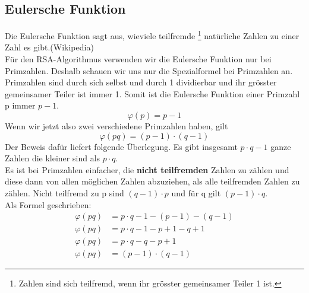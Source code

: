 \subsection{Eulersche Funktion}
Die Eulersche Funktion sagt aus, wieviele teilfremde \footnote{Zahlen sind sich teilfremd, wenn ihr grösster gemeinsamer Teiler 1 ist.} natürliche Zahlen zu einer Zahl es gibt.(Wikipedia)\\
Für den RSA-Algorithmus verwenden wir die Eulersche Funktion nur bei Primzahlen. Deshalb schauen wir uns nur die Spezialformel bei Primzahlen an.\\
Primzahlen sind durch sich selbst und durch 1 dividierbar und ihr grösster gemeinsamer Teiler ist immer 1. Somit ist die Eulersche Funktion einer Primzahl p immer $p - 1$.
%
\begin{equation*}
  \varphi(p) = p - 1
\end{equation*}
%
Wenn wir jetzt also zwei verschiedene Primzahlen haben, gilt
\begin{equation}
  \varphi(pq) = (p - 1) \cdot (q - 1)
  \label{eqn:eulersche_func}
\end{equation}
Der Beweis dafür liefert folgende Überlegung. Es gibt insgesamt $p \cdot q -1$ ganze Zahlen die kleiner sind als $p \cdot q$.\\
Es ist bei Primzahlen einfacher, die \textbf{nicht teilfremden} Zahlen zu zählen und diese dann von allen möglichen Zahlen abzuziehen, als alle teilfremden Zahlen zu zählen. Nicht teilfremd zu p sind $(q - 1) \cdot p$ und für q gilt $ (p - 1) \cdot q$.\\
Als Formel geschrieben:
%
\begin{equation*}
  \begin{split}
    \varphi(pq) & = p \cdot q -1 - (p - 1) - (q - 1)  \\
    \varphi(pq) & = p \cdot q -1 - p + 1 - q + 1  \\
    \varphi(pq) & = p \cdot q -q - p + 1  \\
    \varphi(pq) & = (p -1) \cdot (q - 1)
    \label{eqn:herleitung_eulersche_func}
  \end{split}
\end{equation*}
%
